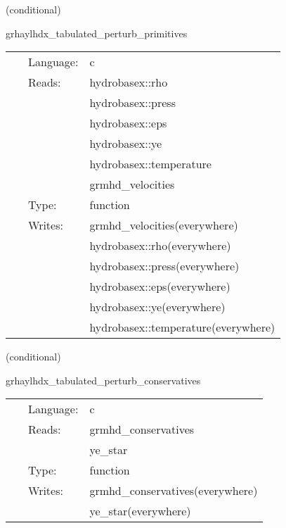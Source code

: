 \documentclass{article}
\begin{document}
\vspace{5mm}

   (conditional) 

\hspace{5mm} grhaylhdx\_tabulated\_perturb\_primitives 

\hspace{5mm}{\it tabulated version of grhaylhdx\_perturb\_primitives } 


\hspace{5mm}

 \begin{tabular*}{160mm}{cll} 
~ & Language:  & c \\ 
~ & Reads:  & hydrobasex::rho \\ 
~& ~ &hydrobasex::press\\ 
~& ~ &hydrobasex::eps\\ 
~& ~ &hydrobasex::ye\\ 
~& ~ &hydrobasex::temperature\\ 
~& ~ &grmhd\_velocities\\ 
~ & Type:  & function \\ 
~ & Writes:  & grmhd\_velocities(everywhere) \\ 
~& ~ &hydrobasex::rho(everywhere)\\ 
~& ~ &hydrobasex::press(everywhere)\\ 
~& ~ &hydrobasex::eps(everywhere)\\ 
~& ~ &hydrobasex::ye(everywhere)\\ 
~& ~ &hydrobasex::temperature(everywhere)\\ 
\end{tabular*} 


\vspace{5mm}

   (conditional) 

\hspace{5mm} grhaylhdx\_tabulated\_perturb\_conservatives 

\hspace{5mm}{\it tabulated version of grhaylhdx\_perturb\_conservatives } 


\hspace{5mm}

 \begin{tabular*}{160mm}{cll} 
~ & Language:  & c \\ 
~ & Reads:  & grmhd\_conservatives \\ 
~& ~ &ye\_star\\ 
~ & Type:  & function \\ 
~ & Writes:  & grmhd\_conservatives(everywhere) \\ 
~& ~ &ye\_star(everywhere)\\ 
\end{tabular*} 
\end{document}
